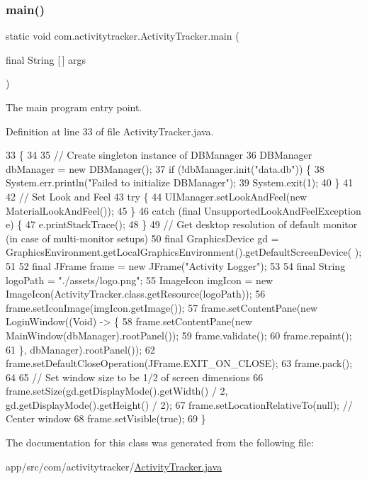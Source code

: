 \subsubsection{\texorpdfstring{main()}{main()}}
{\footnotesize\ttfamily static void com.\+activitytracker.\+Activity\+Tracker.\+main (\begin{DoxyParamCaption}\item[{final String \mbox{[}$\,$\mbox{]}}]{args }\end{DoxyParamCaption})\hspace{0.3cm}{\ttfamily [static]}}

The main program entry point. 

Definition at line 33 of file Activity\+Tracker.\+java.


\begin{DoxyCode}
33                                                  \{
34 
35         \textcolor{comment}{// Create singleton instance of DBManager}
36         DBManager dbManager = \textcolor{keyword}{new} DBManager();
37         \textcolor{keywordflow}{if} (!dbManager.init(\textcolor{stringliteral}{"data.db"})) \{
38             System.err.println(\textcolor{stringliteral}{"Failed to initialize DBManager"});
39             System.exit(1);
40         \}
41 
42         \textcolor{comment}{// Set Look and Feel}
43         \textcolor{keywordflow}{try} \{
44             UIManager.setLookAndFeel(\textcolor{keyword}{new} MaterialLookAndFeel());
45         \}
46         \textcolor{keywordflow}{catch} (\textcolor{keyword}{final} UnsupportedLookAndFeelException e) \{
47             e.printStackTrace();
48         \}
49         \textcolor{comment}{// Get desktop resolution of default monitor (in case of multi-monitor setups)}
50         \textcolor{keyword}{final} GraphicsDevice gd = GraphicsEnvironment.getLocalGraphicsEnvironment().getDefaultScreenDevice(
      );
51 
52         \textcolor{keyword}{final} JFrame frame = \textcolor{keyword}{new} JFrame(\textcolor{stringliteral}{"Activity Logger"});
53 
54         \textcolor{keyword}{final} String logoPath = \textcolor{stringliteral}{"./assets/logo.png"};
55         ImageIcon imgIcon = \textcolor{keyword}{new} ImageIcon(ActivityTracker.class.getResource(logoPath));
56         frame.setIconImage(imgIcon.getImage());
57         frame.setContentPane(\textcolor{keyword}{new} LoginWindow((Void) -> \{
58             frame.setContentPane(\textcolor{keyword}{new} MainWindow(dbManager).rootPanel());
59             frame.validate();
60             frame.repaint();
61         \}, dbManager).rootPanel());
62         frame.setDefaultCloseOperation(JFrame.EXIT\_ON\_CLOSE);
63         frame.pack();
64 
65         \textcolor{comment}{// Set window size to be 1/2 of screen dimensions}
66         frame.setSize(gd.getDisplayMode().getWidth() / 2, gd.getDisplayMode().getHeight() / 2);
67         frame.setLocationRelativeTo(null); \textcolor{comment}{// Center window}
68         frame.setVisible(\textcolor{keyword}{true});
69     \}
\end{DoxyCode}


The documentation for this class was generated from the following file\+:\begin{DoxyCompactItemize}
\item 
app/src/com/activitytracker/\mbox{\hyperlink{_activity_tracker_8java}{Activity\+Tracker.\+java}}\end{DoxyCompactItemize}
